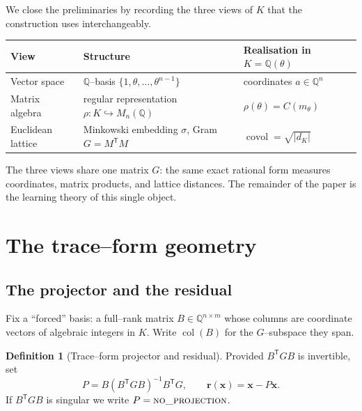 \documentclass[11pt]{article}
\theoremstyle{plain}
\theoremstyle{definition}
\newtheorem{definition}[theorem]{Definition}
\theoremstyle{remark}
\newcommand{\Q}{\mathbb{Q}}
\newcommand{\K}{K}
\newcommand{\rr}{\mathbf{r}}
\newcommand{\xx}{\mathbf{x}}
\newcommand{\GG}{G}
\newcommand{\BB}{B}
\newcommand{\transpose}{^{\mathsf{T}}}
\newcommand{\inv}{^{-1}}
\DeclareMathOperator{\col}{col}
\begin{document}
We close the preliminaries by recording the three views of $\K$ that the construction uses interchangeably.
\begin{center}
\small
\begin{tabular}{lll}
\toprule
View & Structure & Realisation in $\K=\Q(\theta)$ \\
\midrule
Vector space & $\Q$--basis $\{1,\theta,\dots,\theta^{n-1}\}$ & coordinates $a\in\Q^n$ \\
Matrix algebra & regular representation $\rho\colon\K\hookrightarrow M_n(\Q)$ & $\rho(\theta)=C(m_\theta)$ \\
Euclidean lattice & Minkowski embedding $\sigma$, Gram $\GG=M\transpose M$ & $\operatorname{covol}=\sqrt{|d_\K|}$ \\
\bottomrule
\end{tabular}
\end{center}
\noindent The three views share one matrix $\GG$: the same exact rational form measures coordinates, matrix
products, and lattice distances. The remainder of the paper is the learning theory of this single object.

\section{The trace--form geometry}\label{sec:geometry}

\subsection{The projector and the residual}
Fix a ``forced'' basis: a full--rank matrix $\BB\in\Q^{n\times m}$ whose columns are coordinate vectors of
algebraic integers in $\K$. Write $\col(\BB)$ for the $\GG$--subspace they span.

\begin{definition}[Trace--form projector and residual]\label{def:proj}
Provided $\BB\transpose\GG\BB$ is invertible, set
\begin{equation}\label{eq:projector}
  P=\BB(\BB\transpose\GG\BB)\inv\BB\transpose\GG,\qquad \rr(\xx)=\xx-P\xx .
\end{equation}
If $\BB\transpose\GG\BB$ is singular we write $P=\textsc{no\_projection}$.
\end{definition}
\end{document}
